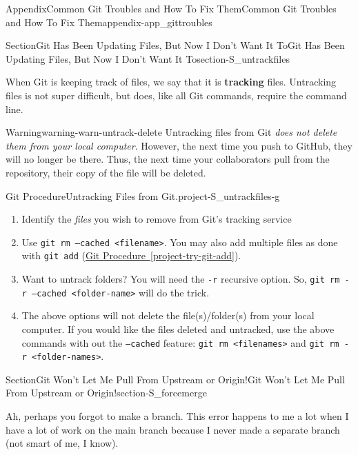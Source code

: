 \documentclass[oneside,10pt,]{book}
\newcommand{\xreffont}{\relax}
\newcommand{\mono}[1]{\texttt{#1}}
\newcommand{\terminology}[1]{\textbf{#1}}
\begin{document}
\begin{appendixptx}{Appendix}{Common Git Troubles and How To Fix Them}{}{Common Git Troubles and How To Fix Them}{}{}{appendix-app_gittroubles}
\begin{sectionptx}{Section}{Git Has Been Updating Files, But Now I Don't Want It To}{}{Git Has Been Updating Files, But Now I Don't Want It To}{}{}{section-S_untrackfiles}
\par
When Git is keeping track of files, we say that it is \terminology{tracking} files. Untracking files is not super difficult, but does, like all Git commands, require the command line.%
\begin{warning}{Warning}{}{warning-warn-untrack-delete}%
Untracking files from Git \emph{does not delete them from your local computer}. However, the next time you push to GitHub, they will no longer be there. Thus, the next time your collaborators pull from the repository, their copy of the file will be deleted.%
\end{warning}
\begin{project}{Git Procedure}{Untracking Files from Git.}{project-S_untrackfiles-g}%
\begin{enumerate}[font=\bfseries,label=(\alph*),ref=\alph*]%
\item{}Identify the \emph{files} you wish to remove from Git's tracking service%
\item{}Use \mono{git rm --cached <filename>}. You may also add multiple files as done with \mono{git add} (\hyperref[project-try-git-add]{Git Procedure~{\xreffont\ref{project-try-git-add}}}).%
\item{}Want to untrack folders? You will need the \mono{-r} recursive option. So, \mono{git rm -r --cached <folder-name>} will do the trick.%
\item{}The above options will not delete the file(s)\slash{}folder(s) from your local computer. If you would like the files deleted and untracked, use the above commands with out the \mono{--cached} feature: \mono{git rm <filenames>} and \mono{git rm -r <folder-names>}.%
\end{enumerate}%
\end{project}%
\end{sectionptx}
%
%
\typeout{************************************************}
\typeout{************************************************}
%
\begin{sectionptx}{Section}{Git Won't Let Me Pull From Upstream or Origin!}{}{Git Won't Let Me Pull From Upstream or Origin!}{}{}{section-S_forcemerge}
%
%
%
%
%
\begin{introduction}{}%
Ah, perhaps you forgot to make a branch. This error happens to me a lot when I have a lot of work on the main branch because I never made a separate branch (not smart of me, I know).%

\end{introduction}
\end{sectionptx}
\end{appendixptx}
\end{document}
